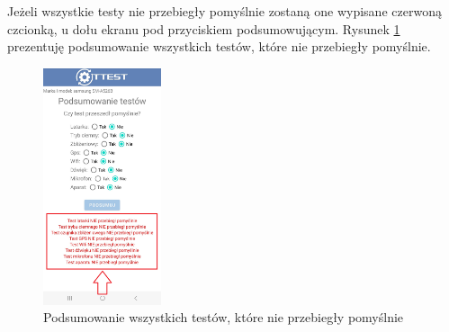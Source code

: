 Jeżeli wszystkie testy nie przebiegły pomyślnie zostaną one wypisane czerwoną czcionką, u dołu ekranu pod przyciskiem podsumowującym. Rysunek \ref{rys:wyniki2} prezentuję podsumowanie wszystkich testów, które nie przebiegły pomyślnie.

\begin{figure}[!hbt]
	\begin{center}
		\includegraphics[angle=360, width=0.31\textwidth]{rys/punkt6/wyniki2}
		\caption{Podsumowanie wszystkich testów, które nie przebiegły pomyślnie}
		\label{rys:wyniki2}
	\end{center}
\end{figure}












